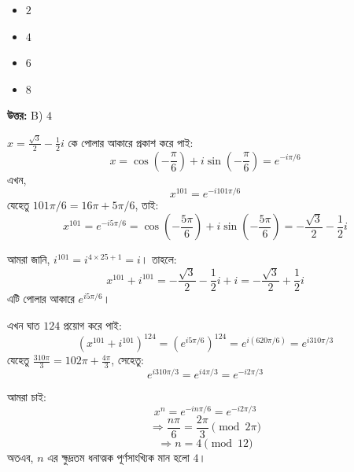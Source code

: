 \documentclass[12pt, a4paper]{article}
\begin{document}
\begin{itemize}[label={}, leftmargin=1cm, itemsep=0.5em]
    \item[\textbf{A)}] $2$
    \item[\textbf{B)}] $4$
    \item[\textbf{C)}] $6$
    \item[\textbf{D)}] $8$
\end{itemize}

\vspace{0.5em}
\begin{tcolorbox}[answerbox]
    \textbf{\color{success} উত্তর:} B) $4$
\end{tcolorbox}
\vspace{1em}

\begin{tcolorbox}[solutionbox={সমাধান (Solution)}]
    \noindent
    $x = \frac{\sqrt{3}}{2} - \frac{1}{2}i$ কে পোলার আকারে প্রকাশ করে পাই:
    \[ x = \cos\left(-\frac{\pi}{6}\right) + i\sin\left(-\frac{\pi}{6}\right) = e^{-i\pi/6} \]
    এখন, 
    \[ x^{101} = e^{-i 101\pi/6} \]
    যেহেতু $101\pi/6 = 16\pi + 5\pi/6$, তাই:
    \[ x^{101} = e^{-i 5\pi/6} = \cos\left(-\frac{5\pi}{6}\right) + i\sin\left(-\frac{5\pi}{6}\right) = -\frac{\sqrt{3}}{2} - \frac{1}{2}i \]
    
    \vspace{0.5em}
    আমরা জানি, $i^{101} = i^{4 \times 25 + 1} = i$। তাহলে:
    \[ x^{101} + i^{101} = -\frac{\sqrt{3}}{2} - \frac{1}{2}i + i = -\frac{\sqrt{3}}{2} + \frac{1}{2}i \]
    এটি পোলার আকারে $e^{i 5\pi/6}$। 
    
    \vspace{0.5em}
    এখন ঘাত $124$ প্রয়োগ করে পাই:
    \[ (x^{101} + i^{101})^{124} = (e^{i 5\pi/6})^{124} = e^{i (620\pi/6)} = e^{i 310\pi/3} \]
    যেহেতু $\frac{310\pi}{3} = 102\pi + \frac{4\pi}{3}$, সেহেতু:
    \[ e^{i 310\pi/3} = e^{i 4\pi/3} = e^{-i 2\pi/3} \]
    
    \vspace{0.5em}
    আমরা চাই:
    \[ x^n = e^{-in\pi/6} = e^{-i 2\pi/3} \]
    \[ \Rightarrow \frac{n\pi}{6} = \frac{2\pi}{3} \pmod{2\pi} \]
    \[ \Rightarrow n = 4 \pmod{12} \]
    অতএব, $n$ এর ক্ষুদ্রতম ধনাত্মক পূর্ণসাংখ্যিক মান হলো $4$।
\end{tcolorbox}
\end{document}

